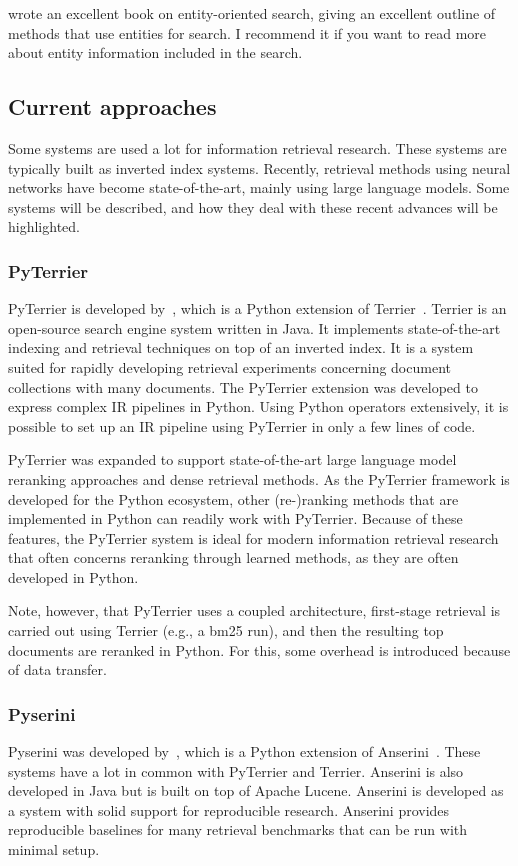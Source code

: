  wrote an excellent book on entity-oriented search, giving an excellent outline of methods that use entities for search. I recommend it if you want to read more about entity information included in the search. 

\subsection{Current approaches}
Some systems are used a lot for information retrieval research. These systems are typically built as inverted index systems. Recently, retrieval methods using neural networks have become state-of-the-art, mainly using large language models. Some systems will be described, and how they deal with these recent advances will be highlighted.  

\subsubsection{PyTerrier}
PyTerrier is developed by~\citet{pyterrier}, which is a Python extension of Terrier~\citep{terrier}. Terrier is an open-source search engine system written in Java. It implements state-of-the-art indexing and retrieval techniques on top of an inverted index. It is a system suited for rapidly developing retrieval experiments concerning document collections with many documents. 
The PyTerrier extension was developed to express complex IR pipelines in Python. Using Python operators extensively, it is possible to set up an IR pipeline using PyTerrier in only a few lines of code. 

PyTerrier was expanded to support state-of-the-art large language model reranking approaches and dense retrieval methods. As the PyTerrier framework is developed for the Python ecosystem, other (re-)ranking methods that are implemented in Python can readily work with PyTerrier. Because of these features, the PyTerrier system is ideal for modern information retrieval research that often concerns reranking through learned methods, as they are often developed in Python.

Note, however, that PyTerrier uses a coupled architecture, first-stage retrieval is carried out using Terrier (e.g., a bm25 run), and then the resulting top documents are reranked in Python. For this, some overhead is introduced because of data transfer. 

\subsubsection{Pyserini}
Pyserini was developed by~\citet{pyserini}, which is a Python extension of Anserini~\citep{anserini}. These systems have a lot in common with PyTerrier and Terrier. Anserini is also developed in Java but is built on top of Apache Lucene. Anserini is developed as a system with solid support for reproducible research. Anserini provides reproducible baselines for many retrieval benchmarks that can be run with minimal setup. 

